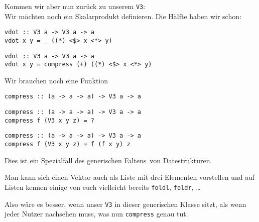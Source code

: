\documentclass{beamer}
\begin{document}
\begin{frame}[fragile]
Kommen wir aber nun zurück zu unserem \texttt{V3}:\\
Wir möchten noch ein Skalarprodukt definieren. Die Hälfte haben wir schon:
\begin{overprint}
\begin{verbatim}
vdot :: V3 a -> V3 a -> a
vdot x y = _ ((*) <$> x <*> y)
\end{verbatim}
\begin{verbatim}
vdot :: V3 a -> V3 a -> a
vdot x y = compress (+) ((*) <$> x <*> y)
\end{verbatim}
\end{overprint}
\pause
\smallskip

Wir brauchen noch eine Funktion
\smallskip

\begin{overprint}
\begin{verbatim}
compress :: (a -> a -> a) -> V3 a -> a
\end{verbatim}
\begin{verbatim}
compress :: (a -> a -> a) -> V3 a -> a
compress f (V3 x y z) = ?
\end{verbatim}
\begin{verbatim}
compress :: (a -> a -> a) -> V3 a -> a
compress f (V3 x y z) = f (f x y) z
\end{verbatim}
\end{overprint}
\pause
\pause
\pause
\pause
\bigskip

Dies ist ein Spezialfall des generischen \glqq Faltens\grqq\ von Datestrukturen.\par

\pause
Man kann sich einen Vektor auch als Liste mit drei Elementen vorstellen und auf Listen kennen einige von euch vielleicht bereits \texttt{foldl}, \texttt{foldr}, \dots
\par
\pause

Also wäre es besser, wenn unser \texttt{V3} in dieser generischen Klasse sitzt, als wenn jeder Nutzer nachsehen muss, was nun \texttt{compress} genau tut.
\end{frame}
\end{document}
